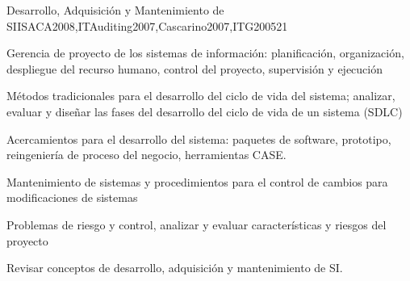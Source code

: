 \begin{syllabus}
\begin{unit}{Desarrollo, Adquisición y Mantenimiento de SI}{}{ISACA2008,ITAuditing2007,Cascarino2007,ITG2005}{2}{1}
\begin{topics}
\item Gerencia de proyecto de los sistemas de información: planificación, organización, despliegue del recurso humano, control del proyecto, supervisión y ejecución
\item Métodos tradicionales para el desarrollo del ciclo de vida del sistema; analizar, evaluar y diseñar las fases del desarrollo del ciclo de vida de un sistema (SDLC)
\item Acercamientos para el desarrollo del sistema: paquetes de software, prototipo, reingeniería de proceso del negocio, herramientas CASE.
\item Mantenimiento de sistemas y procedimientos para el control de cambios para modificaciones de sistemas
\item Problemas de riesgo y control, analizar y evaluar características y riesgos del proyecto
\end{topics}
\begin{learningoutcomes}
\item Revisar conceptos de desarrollo, adquisición y mantenimiento de SI.
\end{learningoutcomes}
\end{unit}


\end{syllabus}
